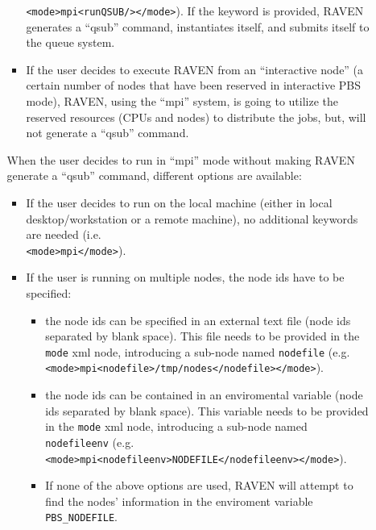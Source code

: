 \begin{itemize}
\begin{itemize}
\begin{itemize}
             \texttt{<mode>mpi<runQSUB/></mode>}).
             If the keyword is provided, RAVEN generates a ``qsub'' command,
             instantiates itself, and submits itself to the queue system.
           \item If the user decides to execute RAVEN from an ``interactive
             node'' (a certain number of nodes that have been reserved in
             interactive PBS mode), RAVEN, using the ``mpi'' system, is going to
             utilize the reserved resources (CPUs and nodes) to distribute the
             jobs, but, will not generate a ``qsub'' command.
         \end{itemize}
     When the user decides to run in ``mpi'' mode without making RAVEN generate
     a ``qsub'' command, different options are available:
      \begin{itemize}
           \item If the user decides to run on the local machine (either in
             local desktop/workstation or a remote machine), no additional
             keywords are needed (i.e.\\ \texttt{<mode>mpi</mode>}).
           \item If the user is running on multiple nodes, the node ids have
             to be specified:
           \begin{itemize}
              \item the node ids can be specified in an external text file
                (node ids separated by blank space).
                This file needs to be provided in the \texttt{mode} xml node,
                introducing a sub-node named \texttt{nodefile} (e.g.\\
                \texttt{<mode>mpi<nodefile>/tmp/nodes</nodefile></mode>}).
              \item the node ids can be contained in an enviromental variable
                (node ids separated by blank space).
                This variable needs to be provided in the \texttt{mode} xml
                node, introducing a sub-node named \texttt{nodefileenv} (e.g.\\
                \texttt{<mode>mpi<nodefileenv>NODEFILE</nodefileenv></mode>}).
                \item If none of the above options are used, RAVEN will attempt
                  to find the nodes' information in the enviroment variable
                  \texttt{PBS\_NODEFILE}.
           \end{itemize}
         \end{itemize}
   \end{itemize}


\end{itemize}
